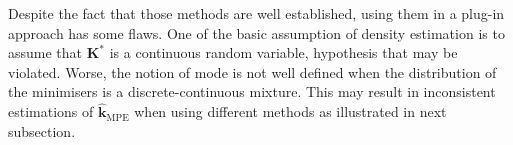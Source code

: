 \documentclass[preprint, 1p]{elsarticle}
\newcommand{\kmpe}{{\mathbf{k}}_{\mathrm{MPE}}}
\newcommand{\hatkmpe}{\hat{\mathbf{k}}_{\mathrm{MPE}}}
\newcommand{\victor}[1]{{\itshape\color{green} ({#1})}}
\begin{document}


Despite the fact that those methods are well established, using them in a plug-in approach has some flaws. One of the basic assumption of density estimation is to assume that $\mathbf{K}^*$ is a continuous random variable, hypothesis that may be violated. Worse, the notion of mode is not well defined when the distribution of the minimisers is a discrete-continuous mixture. This may result in inconsistent 
estimations of $\hatkmpe$ when using different methods as illustrated in next subsection.




\end{document}
